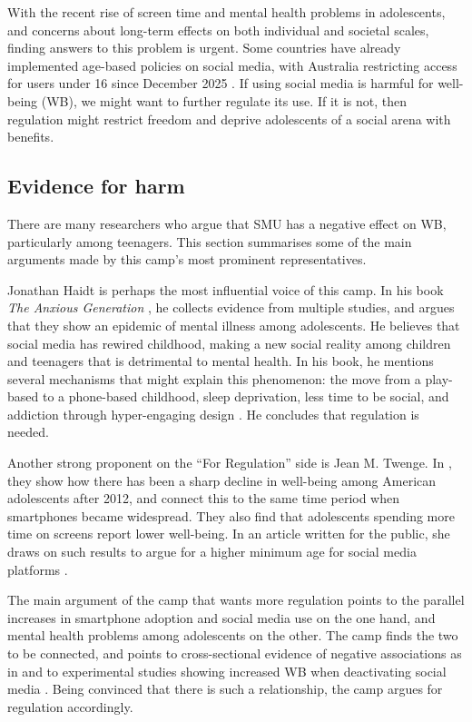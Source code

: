 With the recent rise of screen time and mental health problems in adolescents, and concerns about long-term effects on both individual and societal scales, finding answers to this problem is urgent. Some countries have already implemented age-based policies on social media, with Australia restricting access for users under 16 since December 2025 \parencite[Part~4A]{AustraliaSMMinimumAge2024}. If using social media is harmful for well-being (WB), we might want to further regulate its use. If it is not, then regulation might restrict freedom and deprive adolescents of a social arena with benefits.

\subsection{Evidence for harm}

There are many researchers who argue that SMU has a negative effect on WB, particularly among teenagers. This section summarises some of the main arguments made by this camp's most prominent representatives.

Jonathan Haidt is perhaps the most influential voice of this camp. In his book \emph{The Anxious Generation} \parencite{Haidt2024}, he collects evidence from multiple studies, and argues that they show an epidemic of mental illness among adolescents. He believes that social media has rewired childhood, making a new social reality among children and teenagers that is detrimental to mental health. In his book, he mentions several mechanisms that might explain this phenomenon: the move from a play-based to a phone-based childhood, sleep deprivation, less time to be social, and addiction through hyper-engaging design \parencite[Ch.~5]{Haidt2024}. He concludes that regulation is needed.

Another strong proponent on the ``For Regulation'' side is Jean M. Twenge. In \textcite{Twenge2018}, they show how there has been a sharp decline in well-being among American adolescents after 2012, and connect this to the same time period when smartphones became widespread. They also find that adolescents spending more time on screens report lower well-being. In an article written for the public, she draws on such results to argue for a higher minimum age for social media platforms \parencite{Twenge2025WaPo}.

The main argument of the camp that wants more regulation points to the parallel increases in smartphone adoption and social media use on the one hand, and mental health problems among adolescents on the other. The camp finds the two to be connected, and points to cross-sectional evidence of negative associations as in \textcite{Twenge2018} and to experimental studies showing increased WB when deactivating social media \parencite{Allcott2019}. Being convinced that there is such a relationship, the camp argues for regulation accordingly.

